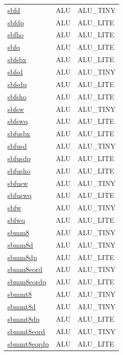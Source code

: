 \begin{small}
\begin{longtable}[l]{l l l}
\hyperlink{lvx.sbfd}{sbfd} & ALU & ALU\_TINY \\ 
\hyperlink{lvx.sbfdp}{sbfdp} & ALU & ALU\_LITE \\ 
\hyperlink{lvx.sbfho}{sbfho} & ALU & ALU\_LITE \\ 
\hyperlink{lvx.sbfq}{sbfq} & ALU & ALU\_LITE \\ 
\hyperlink{lvx.sbfsbx}{sbfsbx} & ALU & ALU\_LITE \\ 
\hyperlink{lvx.sbfsd}{sbfsd} & ALU & ALU\_TINY \\ 
\hyperlink{lvx.sbfsdp}{sbfsdp} & ALU & ALU\_LITE \\ 
\hyperlink{lvx.sbfsho}{sbfsho} & ALU & ALU\_LITE \\ 
\hyperlink{lvx.sbfsw}{sbfsw} & ALU & ALU\_TINY \\ 
\hyperlink{lvx.sbfswq}{sbfswq} & ALU & ALU\_LITE \\ 
\hyperlink{lvx.sbfusbx}{sbfusbx} & ALU & ALU\_LITE \\ 
\hyperlink{lvx.sbfusd}{sbfusd} & ALU & ALU\_TINY \\ 
\hyperlink{lvx.sbfusdp}{sbfusdp} & ALU & ALU\_LITE \\ 
\hyperlink{lvx.sbfusho}{sbfusho} & ALU & ALU\_LITE \\ 
\hyperlink{lvx.sbfusw}{sbfusw} & ALU & ALU\_TINY \\ 
\hyperlink{lvx.sbfuswq}{sbfuswq} & ALU & ALU\_LITE \\ 
\hyperlink{lvx.sbfw}{sbfw} & ALU & ALU\_TINY \\ 
\hyperlink{lvx.sbfwq}{sbfwq} & ALU & ALU\_LITE \\ 
\hyperlink{lvx.sbmm8}{sbmm8} & ALU & ALU\_TINY \\ 
\hyperlink{lvx.sbmm8d}{sbmm8d} & ALU & ALU\_TINY \\ 
\hyperlink{lvx.sbmm8dp}{sbmm8dp} & ALU & ALU\_LITE \\ 
\hyperlink{lvx.sbmm8eord}{sbmm8eord} & ALU & ALU\_TINY \\ 
\hyperlink{lvx.sbmm8eordp}{sbmm8eordp} & ALU & ALU\_LITE \\ 
\hyperlink{lvx.sbmmt8}{sbmmt8} & ALU & ALU\_TINY \\ 
\hyperlink{lvx.sbmmt8d}{sbmmt8d} & ALU & ALU\_TINY \\ 
\hyperlink{lvx.sbmmt8dp}{sbmmt8dp} & ALU & ALU\_LITE \\ 
\hyperlink{lvx.sbmmt8eord}{sbmmt8eord} & ALU & ALU\_TINY \\ 
\hyperlink{lvx.sbmmt8eordp}{sbmmt8eordp} & ALU & ALU\_LITE \\ 

\end{longtable}
\end{small}
